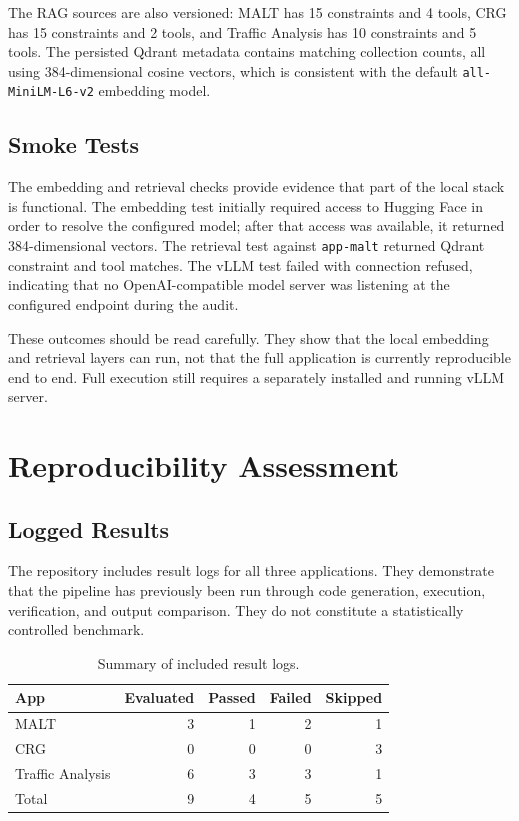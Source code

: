 \documentclass[11pt,a4paper]{article}
\begin{document}
The RAG sources are also versioned: MALT has 15 constraints and 4 tools, CRG has 15 constraints and 2 tools, and Traffic Analysis has 10 constraints and 5 tools. The persisted Qdrant metadata contains matching collection counts, all using 384-dimensional cosine vectors, which is consistent with the default \texttt{all-MiniLM-L6-v2} embedding model.

\subsection{Smoke Tests}

The embedding and retrieval checks provide evidence that part of the local stack is functional. The embedding test initially required access to Hugging Face in order to resolve the configured model; after that access was available, it returned 384-dimensional vectors. The retrieval test against \texttt{app-malt} returned Qdrant constraint and tool matches. The vLLM test failed with connection refused, indicating that no OpenAI-compatible model server was listening at the configured endpoint during the audit.

These outcomes should be read carefully. They show that the local embedding and retrieval layers can run, not that the full application is currently reproducible end to end. Full execution still requires a separately installed and running vLLM server.

\section{Reproducibility Assessment}

\subsection{Logged Results}

The repository includes result logs for all three applications. They demonstrate that the pipeline has previously been run through code generation, execution, verification, and output comparison. They do not constitute a statistically controlled benchmark.

\begin{table}[htbp]
  \centering
  \caption{Summary of included result logs.}
  \label{tab:results}
  \begin{tabular}{lrrrr}
    \toprule
    App & Evaluated & Passed & Failed & Skipped \\
    \midrule
    MALT & 3 & 1 & 2 & 1 \\
    CRG & 0 & 0 & 0 & 3 \\
    Traffic Analysis & 6 & 3 & 3 & 1 \\
    \midrule
    Total & 9 & 4 & 5 & 5 \\
    \bottomrule
  \end{tabular}
\end{table}
\end{document}
